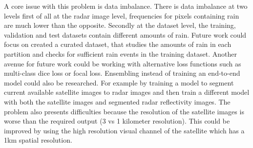 A core issue with this problem is data imbalance. There is data imbalance at two levels
first of all at the radar image level, frequencies for pixels containing rain are much lower than the opposite.
Secondly at the dataset level, the training, validation and test datasets contain different amounts of rain. Future work
could focus on created a curated dataset, that studies the amounts of rain in each partition and checks for sufficient rain events
in the training dataset.
Another avenue for future work could be working with alternative loss functions such as multi-class dice loss or focal loss.
Ensembling instead of training an end-to-end model could also be researched. For example by training a model to segment current available satellite images
to radar images and then train a different model with both the satellite images and segmented radar reflectivity images.
The problem also presents difficulties because the resolution of the satellite images is worse than the required output (3 vs 1 kilometer resolution).
This could be improved by using the high resolution visual channel of the satellite which has a 1km spatial resolution.